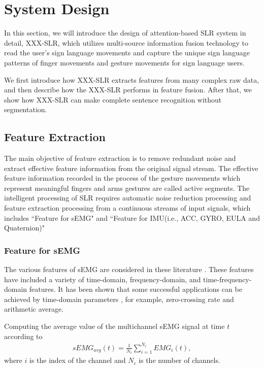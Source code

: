 \documentclass[10pt, conference, letterpaper]{IEEEtran}
\begin{document}
\section{System Design}
\label{sec:DeepSLR}
In this section, we will introduce the design of attention-based SLR system in detail, XXX-SLR, which utilizes multi-source information fusion technology to read the user's sign language movements and capture the unique sign language patterns of finger movements and gesture movements for sign language users.

We first introduce how XXX-SLR extracts features from many complex raw data, and then describe how the XXX-SLR performs in feature fusion. After that, we show how XXX-SLR can make complete sentence recognition without segmentation.
\subsection{Feature Extraction}
The main objective of feature extraction is to remove redundant noise and extract effective feature information from the original signal stream. The effective feature information recorded in the process of the gesture movements which represent meaningful fingers and arms gestures are called active segments. The intelligent processing of SLR requires automatic noise reduction processing and feature extraction processing from a continuous streams of input signals, which includes ``Feature for sEMG" and ``Feature for IMU(i.e., ACC, GYRO, EULA and Quaternion)"
\subsubsection{Feature for sEMG}
The various features of sEMG are considered in these literature \cite{kosmidou2006evaluation,khushaba2007channel}. These features have included a variety of time-domain, frequency-domain, and time-frequency-domain features. It has been shown that some successful applications can be achieved by time-domain parameters \cite{huang2005gaussian}, for example, zero-crossing rate and arithmetic average.

Computing the average value of the multichannel sEMG signal at time $t$ according to
\begin{equation}
\label{emg1}
\begin{aligned}
 sEMG_{avg}(t)= \frac{1}{N_i}\sum_{i=1}^{N_i}EMG_{i}(t),
\end{aligned}
\end{equation}
where $i$ is the index of the channel and $N_c$ is the number of channels.
\end{document}
